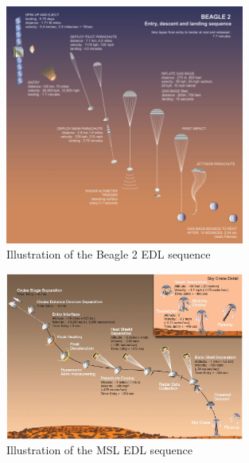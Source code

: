 \begin{figure}[!ht]
\centering
\includegraphics[width=0.7\textwidth]{figures/entry_descent/beagle_edl_laufer2010.jpg}
\caption{Illustration of the Beagle 2 \ac{EDL} sequence \cite{laufer2010}}
\label{fig:beagle_edl_laufer2010}
\end{figure}

\begin{figure}[!ht]
\centering
\includegraphics[width=0.7\textwidth]{figures/entry_descent/msl_edl_brown2012.jpg}
\caption{Illustration of the \ac{MSL} \ac{EDL} sequence \cite{brown2012}}
\label{fig:msl_edl_brown2012}
\end{figure}


